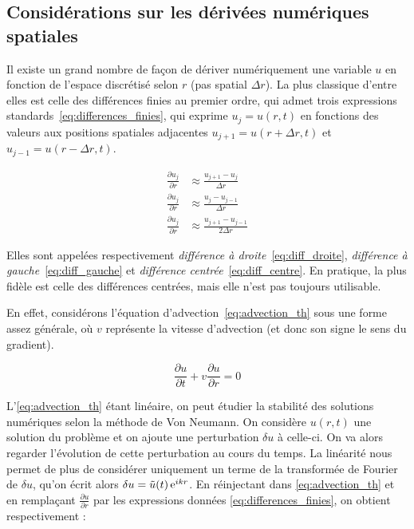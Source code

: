 \subsection{Considérations sur les dérivées numériques spatiales}

Il existe un grand nombre de façon de dériver numériquement une variable $u$ en
fonction de l’espace discrétisé selon $r$ (pas spatial $\Delta{r}$). La plus
classique d’entre elles est celle des différences finies au premier ordre, qui
admet trois expressions standards~\eqref{eq:differences_finies}, qui exprime
$u_j = u(r,t)$ en fonctions des valeurs aux positions spatiales adjacentes
$u_{j+1} = u(r+\Delta{r},t)$ et $u_{j-1} = u(r-\Delta{r},t)$.

\begin{subequations}
    \label{eq:differences_finies}
    \begin{align}
        \label{eq:diff_droite}
        \frac{\partial u_j}{\partial r} &\approx \frac{u_{j+1} - u_j    }{  \Delta{r}}\\
        \label{eq:diff_gauche}
        \frac{\partial u_j}{\partial r} &\approx \frac{u_j     - u_{j-1}}{  \Delta{r}}\\
        \label{eq:diff_centre}
        \frac{\partial u_j}{\partial r} &\approx \frac{u_{j+1} - u_{j-1}}{2 \Delta{r}}
    \end{align}
\end{subequations}

Elles sont appelées respectivement \textit{différence à
droite}~\eqref{eq:diff_droite}, \textit{différence à
gauche}~\eqref{eq:diff_gauche} et \textit{différence
centrée}~\eqref{eq:diff_centre}. En pratique, la plus fidèle est celle des
différences centrées, mais elle n’est pas toujours utilisable.

En effet, considérons l’équation d’advection~\eqref{eq:advection_th} sous une
forme assez générale, où $v$ représente la vitesse d’advection (et donc son
signe le sens du gradient). 

\begin{equation}
    \label{eq:advection_th}
    \frac{\partial u}{\partial t} + v \frac{\partial u}{\partial r} = 0
\end{equation}

L’\cref{eq:advection_th} étant linéaire, on peut étudier la stabilité des
solutions numériques selon la méthode de Von Neumann. On considère $u(r,t)$ une
solution du problème et on ajoute une perturbation $\delta{u}$ à celle-ci. On
va alors regarder l’évolution de cette perturbation au cours du temps. La
linéarité nous permet de plus de considérer uniquement un terme de la
transformée de Fourier de $\delta{u}$, qu’on écrit alors $\delta{u} =
\tilde{u}(t) \operatorname{e}^{ikr}$. En réinjectant dans \eqref{eq:advection_th} et en
remplaçant $\frac{\partial u}{\partial r}$ par les expressions données
\cref{eq:differences_finies}, on obtient respectivement :

